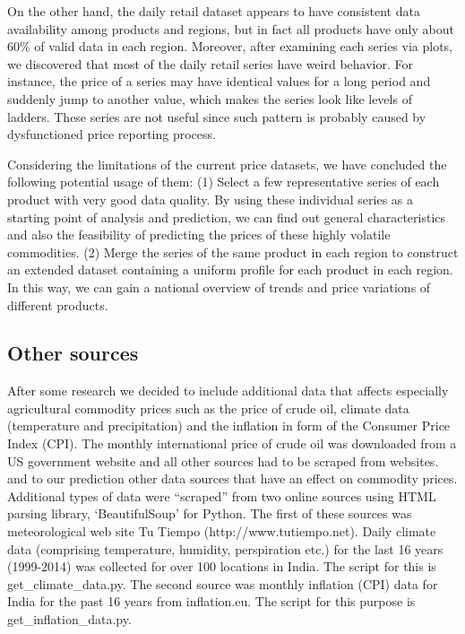 On the other hand, the daily retail dataset appears to have consistent data availability among products and regions, but in fact all products have only about 60\% of valid data in each region. Moreover, after examining each series via plots, we discovered that most of the daily retail series have weird behavior. For instance, the price of a series may have identical values for a long period and suddenly jump to another value, which makes the series look like levels of ladders. These series are not useful since such pattern is probably caused by dysfunctioned price reporting process.

Considering the limitations of the current price datasets, we have concluded the following potential usage of them: (1) Select a few representative series of each product with very good data quality. By using these individual series as a starting point of analysis and prediction, we can find out general characteristics and also the feasibility of predicting the prices of these highly volatile commodities. (2) Merge the series of the same product in each region to construct an extended dataset containing a uniform profile for each product in each region. In this way, we can gain a national overview of trends and price variations of different products.

\subsection*{Other sources}
After some research we decided to include additional data that affects especially agricultural commodity prices such as the price of crude oil, climate data (temperature and precipitation) and the inflation in form of the Consumer Price Index (CPI). The monthly international price of crude oil  was downloaded from a US government website and all other sources had to be scraped from websites.  and  to our prediction other data sources that have an effect on commodity prices. 
Additional types of data were ``scraped'' from two online sources using HTML parsing library, `BeautifulSoup' for Python. The first of these sources was meteorological web site Tu Tiempo (http://www.tutiempo.net). Daily climate data (comprising temperature, humidity, perspiration etc.) for the last 16 years (1999-2014) was collected for over 100 locations in India. The script for this is get\_climate\_data.py. The second source was monthly inflation (CPI) data for India for the past 16 years from inflation.eu. The script for this purpose is get\_inflation\_data.py.

